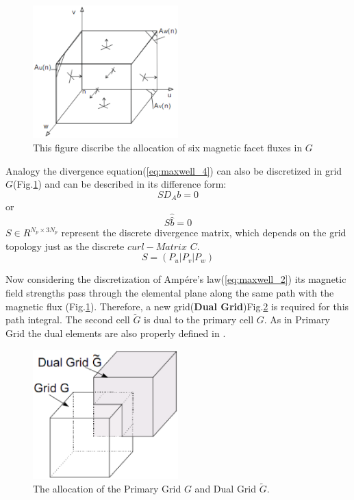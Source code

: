 \begin{figure}
\centering
\includegraphics[width=0.5\textwidth]{bilder/divergence_in_grid}
\caption{This figure discribe the allocation of six magnetic facet fluxes in $G$}
\label{fig:divergence_G}
\end{figure}
Analogy the divergence equation(\ref{eq:maxwell_4}) can also be discretized in grid $G$(Fig.\ref{fig:divergence_G}) and can be described in its difference form: 
\begin{equation}
SD_{A}b=0
\label{eq:divergence_sample}
\end{equation}
or
\begin{equation}
S\widehat{\widehat{b}}=0
\label{eq:divergence_integral}
\end{equation}
$S\in R^{N_{p}\times 3N_{p}}$ represent the discrete divergence matrix, which depends on the grid topology just as the discrete $curl-Matrix$ $C$.
\begin{equation}
S=(P_{u}|P_{v}|P_{w})
\label{eq:S_matrix}
\end{equation}


Now considering the discretization of Amp\'ere's law(\ref{eq:maxwell_2}) its magnetic field strengths pass through the elemental plane along the same path with the magnetic flux (Fig.\ref{fig:divergence_G}). Therefore, a new grid(\textbf{Dual Grid})Fig.\ref{fig:dual_grid} is required for this path integral. The second cell $\tilde{G}$ is dual to the primary cell $G$. As in Primary Grid the dual elements are also properly defined in \cite{script_FeldSim}.

\begin{figure}
\centering
\includegraphics[width=0.5\textwidth]{bilder/dual_grid}
\caption{The allocation of the Primary Grid $G$ and Dual Grid $\tilde{G}$.}
\label{fig:dual_grid}
\end{figure}

